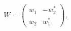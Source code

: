 \begin{equation}
W= \left(
\begin{array}{cc}
w_{1} & -w_{2}^{\ast}\\
w_{2} & w_{1}^{\ast}
\end{array}
\right),
\end{equation}

